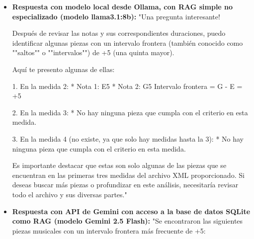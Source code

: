 \begin{itemize}
* IE-2019-D-HLS-002 (Título: IE-2019-D-HLS-002, Autor: , Compás: 4/4, Tonalidad: G mayor, BPM: 62)
* IE-2019-D-HLS-005 (Título: IE-2019-D-HLS-005, Autor: , Compás: 12/8, Tonalidad: G mayor, BPM: 96)
* IE-2019-D-HLS-028 (Título: IE-2019-D-HLS-028, Autor: , Compás: 4/4, Tonalidad: G mayor, BPM: 120)
* IE-2019-D-HLS-035 (Título: IE-2019-D-HLS-035, Autor: , Compás: 4/4, Tonalidad: C mayor, BPM: 90)
* IE-2019-D-HLS-038 (Título: IE-2019-D-HLS-038, Autor: , Compás: 2/4, Tonalidad: C mayor, BPM: 80)
* IE-2019-D-HLS-047 (Título: IE-2019-D-HLS-047, Autor: , Compás: 3/8, Tonalidad: G mayor, BPM: 112)
* IE-2019-D-HLS-048 (Título: IE-2019-D-HLS-048, Autor: , Compás: 6/8, Tonalidad: G mayor, BPM: 80)
* IE-2019-D-HLS-057 (Título: IE-2019-D-HLS-057, Autor: , Compás: 4/4, Tonalidad: G mayor, BPM: 128)
* IE-2019-D-HLS-062 (Título: IE-2019-D-HLS-062, Autor: , Compás: 6/4, Tonalidad: B menor, BPM: 180)
* Ejercicio (Título: Ejercicio, Autor: José Miguel Hernández Jaramillo, Compás: 4/4, Tonalidad: G mayor)"
\item \textbf{Respuesta con modelo local desde Ollama, con RAG simple no especializado (modelo llama3.1:8b):} "Una pregunta interesante!

Después de revisar las notas y sus correspondientes duraciones, puedo identificar algunas piezas con un intervalo frontera (también conocido como ""saltos"" o ""intervalos"") de +5 (una quinta mayor).

Aquí te presento algunas de ellas:

1. En la medida 2:
 * Nota 1: E5
 * Nota 2: G5
 Intervalo frontera = G - E = +5

2. En la medida 3:
 * No hay ninguna pieza que cumpla con el criterio en esta medida.

3. En la medida 4 (no existe, ya que solo hay medidas hasta la 3):
 * No hay ninguna pieza que cumpla con el criterio en esta medida.

Es importante destacar que estas son solo algunas de las piezas que se encuentran en las primeras tres medidas del archivo XML proporcionado. Si deseas buscar más piezas o profundizar en este análisis, necesitaría revisar todo el archivo y sus diversas partes."
\item \textbf{Respuesta con API de Gemini con acceso a la base de datos SQLite como RAG (modelo Gemini 2.5 Flash):} "Se encontraron las siguientes piezas musicales con un intervalo frontera más frecuente de +5:


\end{itemize}

